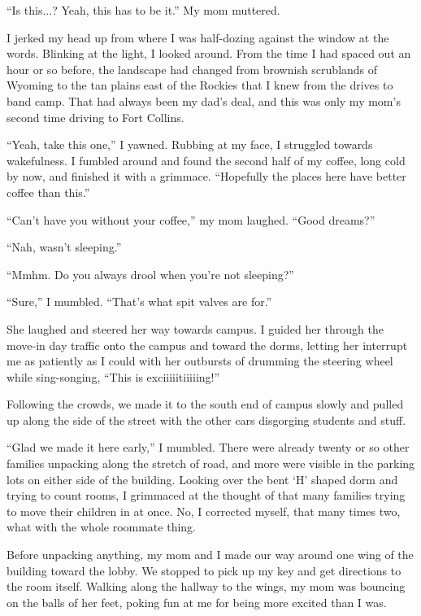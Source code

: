 ``Is this...?  Yeah, this has to be it.''  My mom muttered.

I jerked my head up from where I was half-dozing against the window at the words.  Blinking at the light, I looked around.  From the time I had spaced out an hour or so before, the landscape had changed from brownish scrublands of Wyoming to the tan plains east of the Rockies that I knew from the drives to band camp.  That had always been my dad's deal, and this was only my mom's second time driving to Fort Collins.

``Yeah, take this one,'' I yawned.  Rubbing at my face, I struggled towards wakefulness.  I fumbled around and found the second half of my coffee, long cold by now, and finished it with a grimmace.  ``Hopefully the places here have better coffee than this.''

``Can't have you without your coffee,'' my mom laughed.  ``Good dreams?''

``Nah, wasn't sleeping.''

``Mmhm.  Do you always drool when you're not sleeping?''

``Sure,'' I mumbled.  ``That's what spit valves are for.''

She laughed and steered her way towards campus.  I guided her through the move-in day traffic onto the campus and toward the dorms, letting her interrupt me as patiently as I could with her outbursts of drumming the steering wheel while sing-songing, ``This is exciiiiitiiiiing!''

Following the crowds, we made it to the south end of campus slowly and pulled up along the side of the street with the other cars disgorging students and stuff.

``Glad we made it here early,'' I mumbled.  There were already twenty or so other families unpacking along the stretch of road, and more were visible in the parking lots on either side of the building.  Looking over the bent `H' shaped dorm and trying to count rooms, I grimmaced at the thought of that many families trying to move their children in at once.  No, I corrected myself, that many times two, what with the whole roommate thing.

Before unpacking anything, my mom and I made our way around one wing of the building toward the lobby.  We stopped to pick up my key and get directions to the room itself.  Walking along the hallway to the wings, my mom was bouncing on the balls of her feet, poking fun at me for being more excited than I was.

